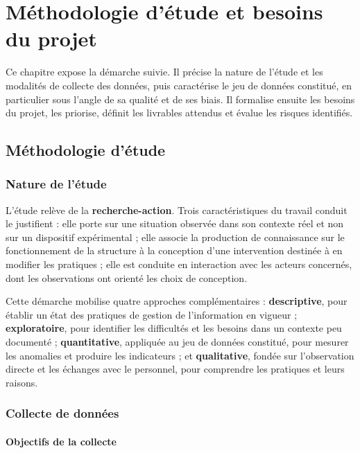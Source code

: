 \chapter{Méthodologie d'étude et besoins du projet}
\label{chap:deux}

Ce chapitre expose la démarche suivie. Il précise la nature de l'étude et les modalités de collecte des données, puis caractérise le jeu de données constitué, en particulier sous l'angle de sa qualité et de ses biais. Il formalise ensuite les besoins du projet, les priorise, définit les livrables attendus et évalue les risques identifiés.

\section{Méthodologie d'étude}
\label{sec:2-1}

\subsection{Nature de l'étude}

L'étude relève de la \textbf{recherche-action}. Trois caractéristiques du travail conduit le justifient : elle porte sur une situation observée dans son contexte réel et non sur un dispositif expérimental ; elle associe la production de connaissance sur le fonctionnement de la structure à la conception d'une intervention destinée à en modifier les pratiques ; elle est conduite en interaction avec les acteurs concernés, dont les observations ont orienté les choix de conception.

Cette démarche mobilise quatre approches complémentaires : \textbf{descriptive}, pour établir un état des pratiques de gestion de l'information en vigueur ; \textbf{exploratoire}, pour identifier les difficultés et les besoins dans un contexte peu documenté ; \textbf{quantitative}, appliquée au jeu de données constitué, pour mesurer les anomalies et produire les indicateurs ; et \textbf{qualitative}, fondée sur l'observation directe et les échanges avec le personnel, pour comprendre les pratiques et leurs raisons.

\subsection{Collecte de données}

\subsubsection{Objectifs de la collecte}

